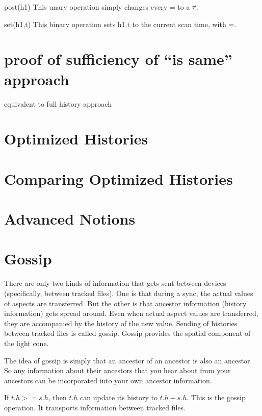 \documentclass{book}
\begin{document}
post(h1)   This unary operation simply changes every = to a ≠.

set(h1,t)  This binary operation sets h1.t to the current scan time, with =.





\section{proof of sufficiency of ``is same'' approach}

equivalent to full history approach


\section{Optimized Histories}

\section{Comparing Optimized Histories}





\section*{Advanced Notions}




\section{Gossip}

There are only two kinds of information that gets sent between devices (specifically, between tracked files).  One is that during a sync, the actual values of aspects are transferred.  But the other is that ancestor information (history information) gets spread around.  Even when actual aspect values are transferred, they are accompanied by the history of the new value.  Sending of histories between tracked files is called gossip.  Gossip provides the spatial component of the light cone.

The idea of gossip is simply that an ancestor of an ancestor is also an ancestor.  So any information about their ancestors that you hear about from your ancestors can be incorporated into your own ancestor information.

If $t.h >= s.h$, then $t.h$ can update its history to $t.h + s.h$.
This is the gossip operation.  It transports information between tracked files.
\end{document}
